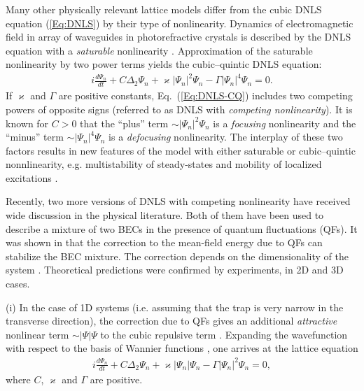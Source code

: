 \documentclass[12pt,reqno]{amsart}
\begin{document}
Many other physically relevant lattice models differ from the cubic 
DNLS equation (\ref{Eq:DNLS}) by their type of nonlinearity. Dynamics of electromagnetic field in array of waveguides in photorefractive crystals is described by the DNLS equation with a {\it saturable} nonlinearity \cite{HMSK04}.  Approximation of the saturable nonlinearity by two power terms yields the cubic--quintic DNLS equation:
\begin{gather}
    i\frac{d\Psi_n}{d t}+C\Delta_2\Psi_n+\varkappa\left|\Psi_n\right|^2\Psi_n-\Gamma\left|\Psi_n\right|^4\Psi_n=0. 
    \label{Eq:DNLS-CQ}
\end{gather} 
If  $\varkappa$ and $\Gamma$ are positive constants, Eq.~(\ref{Eq:DNLS-CQ}) includes two competing powers of opposite signs (referred to as DNLS with {\it competing nonlinearity}).  It is known for $C > 0$ that the ``plus'' term $\sim\left|\Psi_n\right|^2\Psi_n$ is a {\em focusing} nonlinearity and the ``minus'' term $\sim\left|\Psi_n\right|^4\Psi_n$ is a {\em defocusing} nonlinearity. The interplay of these two factors results in new features of the model with either saturable or cubic--quintic nonnlinearity, e.g.  multistability of steady-states \cite{CTCM2006,TD10,CP11} and mobility of localized excitations \cite{MHM07,MHM08,MVM13,AT2019,MCKC06,MCKC08,AKLP19}.

Recently, two more versions of DNLS with competing nonlinearity have received wide discussion in the physical literature. Both of them have been used to describe a mixture of two BECs in the presence of quantum fluctuations (QFs). It was shown in \cite{P15} that the correction to  the mean-field energy due to QFs can stabilize the BEC mixture.  The correction depends on the dimensionality of the system \cite{AP16}.  Theoretical predictions were confirmed by experiments,  in 2D \cite{Experiment01} and 3D \cite{Experiment02} cases.

(i) In the case of 1D systems (i.e. assuming that the trap is  very narrow in the transverse direction), the correction due to QFs gives an additional {\it attractive} nonlinear term $\sim |\Psi|\Psi$ to the cubic repulsive term \cite{ZYZZ2021,KZ2024}. Expanding the wavefunction with respect to the basis of Wannier functions \cite{AKKS04}, one arrives at the lattice equation \cite{Droplets01,Droplets02,SuzantoStudies}
\begin{gather}
    i\frac{d\Psi_n}{d t}+C\Delta_2\Psi_n+\varkappa\left|\Psi_n\right|\Psi_n-\Gamma\left|\Psi_n\right|^2\Psi_n=0,
    \label{Eq:Droplets01}
\end{gather}
where  $C$, $\varkappa$ and $\Gamma$ are positive. 
\end{document}
